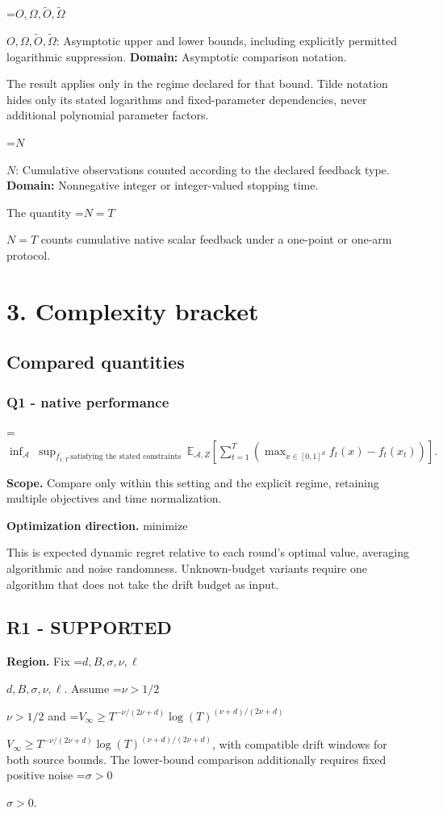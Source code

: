 \documentclass[10pt,a4paper]{article}
\newcommand{\AtlasMath}[1]{\par\begingroup\centering\setbox0=\hbox{$\displaystyle #1$}\ifdim\wd0>1.4\linewidth\typeout{ATLAS WIDE FORMULA: \the\wd0}\fi\ifdim\wd0>\linewidth\resizebox{\linewidth}{!}{\box0}\else\box0\fi\par\endgroup}
\newcommand{\AtlasInlineMath}[1]{\begingroup\setbox0=\hbox{$#1$}\ifdim\wd0>.4\linewidth\endgroup\AtlasMath{#1}\else\endgroup$#1$\fi}
\begin{document}
\AtlasInlineMath{O,\Omega,\widetilde O,\widetilde\Omega}: Asymptotic upper and lower bounds, including explicitly permitted logarithmic suppression. \textbf{Domain:} Asymptotic comparison notation.

The result applies only in the regime declared for that bound. Tilde notation hides only its stated logarithms and fixed-parameter dependencies, never additional polynomial parameter factors.

\AtlasInlineMath{N}: Cumulative observations counted according to the declared feedback type. \textbf{Domain:} Nonnegative integer or integer-valued stopping time.

The quantity \AtlasInlineMath{N=T} counts cumulative native scalar feedback under a one-point or one-arm protocol.

\section{3. Complexity bracket}
\subsection{Compared quantities}
\subsubsection{Q1 - native performance}
\AtlasMath{\inf_{\mathcal A}\ \sup_{f_{1:T}\ \text{satisfying the stated constraints}}\ \mathbb E_{\mathcal A,Z}\!\left[\sum_{t=1}^{T}\left(\max_{x\in[0,1]^d}f_t(x)-f_t(x_t)\right)\right].}
\textbf{Scope.} Compare only within this setting and the explicit regime, retaining multiple objectives and time normalization.

\textbf{Optimization direction.} minimize

This is expected dynamic regret relative to each round's optimal value, averaging algorithmic and noise randomness. Unknown-budget variants require one algorithm that does not take the drift budget as input.

\subsection{R1 - SUPPORTED}
\textbf{Region.} Fix \AtlasInlineMath{d,B,\sigma,\nu,\ell}. Assume \AtlasInlineMath{\nu>1/2} and \AtlasInlineMath{V_\infty\ge T^{-\nu/(2\nu+d)}\log(T)^{(\nu+d)/(2\nu+d)}}, with compatible drift windows for both source bounds. The lower-bound comparison additionally requires fixed positive noise \AtlasInlineMath{\sigma>0}.
\end{document}
